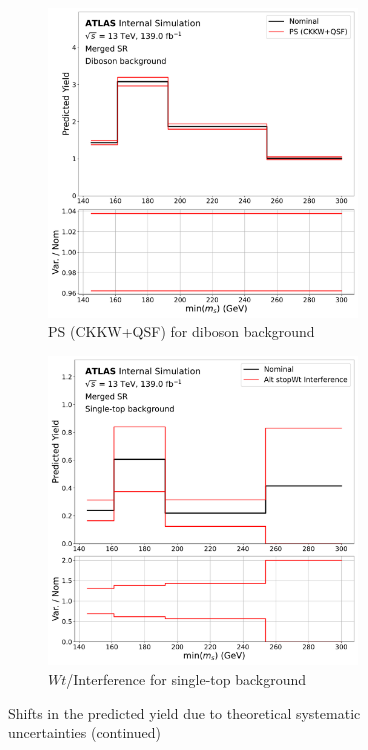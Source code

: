 \begin{figure}
  \begin{subfigure}{0.45\textwidth}
      \centering
    \includegraphics[width=0.9\textwidth]{Figures/6/ckkw_plus_qsf_syst_Diboson_SR_mgd_TARJets10_minmS_mgd_yield.pdf}
    \caption{PS (CKKW+QSF) for diboson background}
    \label{fig:diboson_PS}
  \end{subfigure} \hspace{1em}
  \begin{subfigure}{0.45\textwidth}
      \centering
    \includegraphics[width=0.9\textwidth]{Figures/6/2pt_DS_syst_stop_SR_mgd_TARJets10_minmS_mgd_yield.pdf}
    \caption{\(Wt\)/\ttbar Interference for single-top background}
    \label{fig:stop_DS}
  \end{subfigure}
  \caption{Shifts in the predicted yield due to theoretical systematic uncertainties (continued) }
\end{figure}

